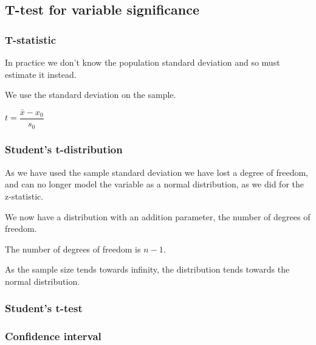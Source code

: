 
\subsection{T-test for variable significance}

\subsubsection{T-statistic}

In practice we don't know the population standard deviation and so must estimate it instead.

We use the standard deviation on the sample.

\(t=\dfrac{\bar x-x_0}{s_0 }\)

\subsubsection{Student's t-distribution}

As we have used the sample standard deviation we have lost a degree of freedom, and can no longer model the variable as a normal distribution, as we did for the z-statistic.

We now have a distribution with an addition parameter, the number of degrees of freedom.

The number of degrees of freedom is \(n-1\).

As the sample size tends towards infinity, the distribution tends towards the normal distribution.

\subsubsection{Student's t-test}

\subsubsection{Confidence interval}


